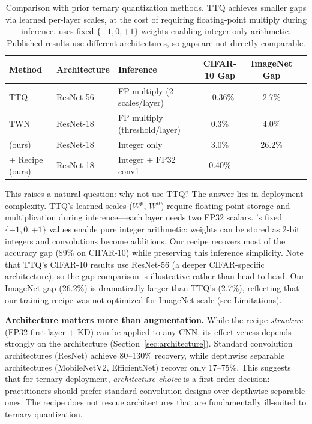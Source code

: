 \documentclass[10pt]{article}
\begin{document}
\begin{table}[ht]
\centering
\caption{Comparison with prior ternary quantization methods. TTQ achieves smaller gaps via learned per-layer scales, at the cost of requiring floating-point multiply during inference. \bitnetb{} uses fixed $\{-1,0,+1\}$ weights enabling integer-only arithmetic. Published results use different architectures, so gaps are not directly comparable.}
\label{tab:ternary_comparison}
\begin{tabular}{lllccc}
\toprule
Method & Architecture & Inference & CIFAR-10 Gap & ImageNet Gap \\
\midrule
TTQ~\cite{zhu2017ttq} & ResNet-56 & FP multiply (2 scales/layer) & $-$0.36\% & 2.7\% \\
TWN~\cite{li2016ternary} & ResNet-18 & FP multiply (threshold/layer) & 0.3\% & 4.0\% \\
\midrule
\bitnetb{} (ours) & ResNet-18 & Integer only & 3.0\% & 26.2\% \\
+ Recipe (ours) & ResNet-18 & Integer + FP32 conv1 & 0.40\% & --- \\
\bottomrule
\end{tabular}
\end{table}

This raises a natural question: why not use TTQ? The answer lies in deployment complexity. TTQ's learned scales ($W^p$, $W^n$) require floating-point storage and multiplication during inference---each layer needs two FP32 scalars. \bitnetb{}'s fixed $\{-1,0,+1\}$ values enable pure integer arithmetic: weights can be stored as 2-bit integers and convolutions become additions. Our recipe recovers most of the accuracy gap (89\% on CIFAR-10) while preserving this inference simplicity. Note that TTQ's CIFAR-10 results use ResNet-56 (a deeper CIFAR-specific architecture), so the gap comparison is illustrative rather than head-to-head. Our ImageNet gap (26.2\%) is dramatically larger than TTQ's (2.7\%), reflecting that our training recipe was not optimized for ImageNet scale (see Limitations).

\textbf{Architecture matters more than augmentation.}
While the recipe \emph{structure} (FP32 first layer + KD) can be applied to any CNN, its effectiveness depends strongly on the architecture (Section~\ref{sec:architecture}). Standard convolution architectures (ResNet) achieve 80--130\% recovery, while depthwise separable architectures (MobileNetV2, EfficientNet) recover only 17--75\%. This suggests that for ternary deployment, \emph{architecture choice} is a first-order decision: practitioners should prefer standard convolution designs over depthwise separable ones. The recipe does not rescue architectures that are fundamentally ill-suited to ternary quantization.
\end{document}

